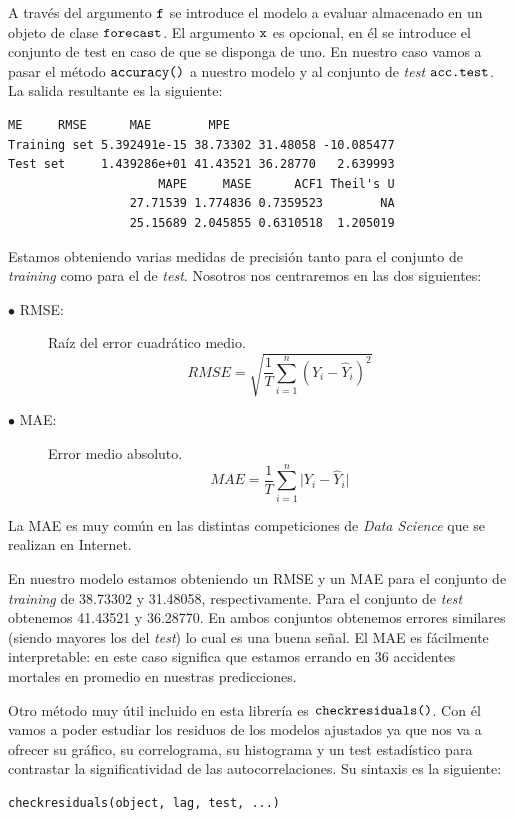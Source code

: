 A través del argumento $\verb!f!$ se introduce el modelo a evaluar almacenado en un objeto de clase $\verb!forecast!$. El argumento $\verb!x!$ es opcional, en él se introduce el conjunto de test en caso de que se disponga de uno. En nuestro caso vamos a pasar el método $\verb!accuracy()!$ a nuestro modelo  y al conjunto de \textit{test} $\verb!acc.test!$. La salida resultante es la siguiente:
\begin{Verbatim}[fontsize=\footnotesize]
                       ME     RMSE      MAE        MPE
Training set 5.392491e-15 38.73302 31.48058 -10.085477
Test set     1.439286e+01 41.43521 36.28770   2.639993
                     MAPE     MASE      ACF1 Theil's U
                 27.71539 1.774836 0.7359523        NA
                 25.15689 2.045855 0.6310518  1.205019
\end{Verbatim}

Estamos obteniendo varias medidas de precisión tanto para el conjunto de \textit{training} como para el de \textit{test}. Nosotros nos centraremos en las dos siguientes:

\begin{description}
  \item[$\bullet$ RMSE:]Raíz del error cuadrático medio.
    \begin{equation}
    RMSE = \sqrt{\frac{1}{T} \sum_{i = 1}^{n}(Y_i - \widehat{Y}_i)^2}
    \end{equation}
  \item[$\bullet$ MAE:]Error medio absoluto.
  \begin{equation}
    MAE = \frac{1}{T} \sum_{i = 1}^{n} \lvert Y_i - \widehat{Y}_i \lvert
  \end{equation}
\end{description}

La MAE es muy común en las distintas competiciones de \textit{Data Science} que se realizan en Internet.

En nuestro modelo estamos obteniendo un RMSE y un MAE para el conjunto de \textit{training} de 38.73302 y 31.48058, respectivamente. Para el conjunto de \textit{test} obtenemos 41.43521 y 36.28770. En ambos conjuntos obtenemos errores similares (siendo mayores los del \textit{test}) lo cual es una buena señal. El MAE es fácilmente interpretable: en este caso significa que estamos errando en 36 accidentes mortales en promedio en nuestras predicciones.

Otro método muy útil incluido en esta librería es $\verb!checkresiduals()!$. Con él vamos a poder estudiar los residuos de los modelos ajustados ya que nos va a ofrecer su gráfico, su correlograma, su histograma y un test estadístico para contrastar la significatividad de las autocorrelaciones. Su sintaxis es la siguiente:
\begin{Verbatim}[fontsize=\footnotesize]
checkresiduals(object, lag, test, ...)
\end{Verbatim}

